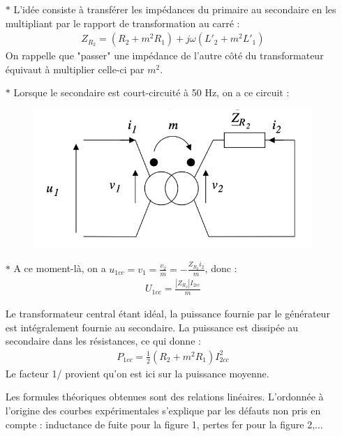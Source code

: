 \documentclass{report}
\begin{document}
\begin{itemize}
	
	\item[$\ast$] L’idée consiste à transférer les impédances du primaire au secondaire en les multipliant par le rapport de transformation au carré :
	\begin{align*}
		Z_{R_2}=(R_2+m^2R_1)+j\omega(L'_2+m^2L'_1)
	\end{align*}
	On rappelle que "passer" une impédance de l'autre côté du transformateur équivaut à multiplier celle-ci par $m^2$.
	
	\item[$\ast$] Lorsque le secondaire est court-circuité à 50 Hz, on a ce circuit :
	
\begin{figure}[h!]
	\centering
		\includegraphics[scale=0.45]{transfo_reel_corr.png}
\end{figure}		

	\item[$\ast$] A ce moment-là, on a $u_{1cc}=v_1=\frac{v_2}{m}=-\frac{Z_{R_2}i_2}{m}$, donc :
	\begin{align*}
		U_{1cc}=\frac{|Z_{R_2}|I_{2cc}}{m}
	\end{align*}
	
	Le transformateur central étant idéal, la puissance fournie par le générateur est intégralement fournie au secondaire. La puissance est dissipée au secondaire dans les résistances, ce qui donne :
	\begin{align*}
		P_{1cc}=\frac{1}{2}(R_2+m^2R_1)I_{2cc}^2
	\end{align*}
	Le facteur 1/ provient qu'on est ici sur la puissance moyenne.
	
 Les formules théoriques obtenues sont des relations linéaires. L'ordonnée à l'origine des courbes expérimentales s'explique par les défauts non pris en compte : inductance de fuite pour la figure 1, pertes fer pour la figure 2,...	


\end{itemize}
\end{document}
